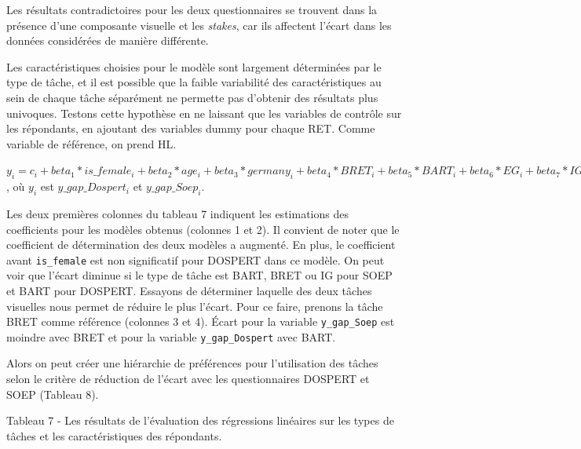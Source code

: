 \documentclass[12pt]{article}
\begin{document}
Les résultats contradictoires pour les deux questionnaires se trouvent
dans la présence d'une composante visuelle et les \emph{stakes}, car ils
affectent l'écart dans les données considérées de manière différente.

Les caractéristiques choisies pour le modèle sont largement déterminées
par le type de tâche, et il est possible que la faible variabilité des
caractéristiques au sein de chaque tâche séparément ne permette pas
d'obtenir des résultats plus univoques. Testons cette hypothèse en ne
laissant que les variables de contrôle sur les répondants, en ajoutant
des variables dummy pour chaque RET. Comme variable de référence, on
prend HL.

\(y_i = c_i + beta_1 * is\_female_i+ beta_2 * age_i + beta_3 * germany_i + beta_4 * BRET_i + beta_5 * BART_i + beta_6 * EG_i + beta_7 * IG_i + epsilon_i\)
, où \(y_i\) est \(y\_gap\_Dospert_i\) et \(y\_gap\_Soep_i\).

Les deux premières colonnes du tableau 7 indiquent les estimations des
coefficients pour les modèles obtenus (colonnes 1 et 2). Il convient de
noter que le coefficient de détermination des deux modèles a augmenté.
En plus, le coefficient avant \texttt{is\_female} est non significatif
pour DOSPERT dans ce modèle. On peut voir que l'écart diminue si le type
de tâche est BART, BRET ou IG pour SOEP et BART pour DOSPERT. Essayons
de déterminer laquelle des deux tâches visuelles nous permet de réduire
le plus l'écart. Pour ce faire, prenons la tâche BRET comme référence
(colonnes 3 et 4). Écart pour la variable \texttt{y\_gap\_Soep} est
moindre avec BRET et pour la variable \texttt{y\_gap\_Dospert} avec
BART.

Alors on peut créer une hiérarchie de préférences pour l'utilisation des
tâches selon le critère de réduction de l'écart avec les questionnaires
DOSPERT et SOEP (Tableau 8).

\newpage

Tableau 7 - Les résultats de l'évaluation des régressions linéaires sur
les types de tâches et les caractéristiques des répondants.
\end{document}
